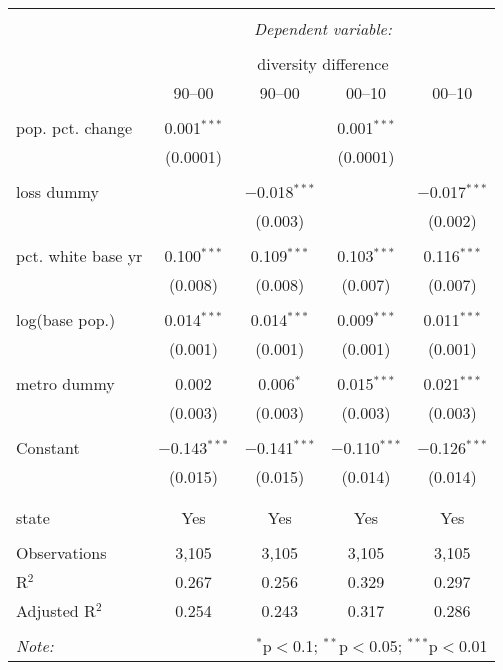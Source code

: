
\begin{table}[!htbp] \centering 
  \caption{} 
  \label{} 
\begin{tabular}{@{\extracolsep{5pt}}lcccc} 
\\[-1.8ex]\hline 
\hline \\[-1.8ex] 
 & \multicolumn{4}{c}{\textit{Dependent variable:}} \\ 
\cline{2-5} 
\\[-1.8ex] & \multicolumn{4}{c}{diversity difference} \\ 
 & 90--00 & 90--00 & 00--10 & 00--10 \\ 
\hline \\[-1.8ex] 
 pop. pct. change & 0.001$^{***}$ &  & 0.001$^{***}$ &  \\ 
  & (0.0001) &  & (0.0001) &  \\ 
  & & & & \\ 
 loss dummy &  & $-$0.018$^{***}$ &  & $-$0.017$^{***}$ \\ 
  &  & (0.003) &  & (0.002) \\ 
  & & & & \\ 
 pct. white base yr & 0.100$^{***}$ & 0.109$^{***}$ & 0.103$^{***}$ & 0.116$^{***}$ \\ 
  & (0.008) & (0.008) & (0.007) & (0.007) \\ 
  & & & & \\ 
 log(base pop.) & 0.014$^{***}$ & 0.014$^{***}$ & 0.009$^{***}$ & 0.011$^{***}$ \\ 
  & (0.001) & (0.001) & (0.001) & (0.001) \\ 
  & & & & \\ 
 metro dummy & 0.002 & 0.006$^{*}$ & 0.015$^{***}$ & 0.021$^{***}$ \\ 
  & (0.003) & (0.003) & (0.003) & (0.003) \\ 
  & & & & \\ 
 Constant & $-$0.143$^{***}$ & $-$0.141$^{***}$ & $-$0.110$^{***}$ & $-$0.126$^{***}$ \\ 
  & (0.015) & (0.015) & (0.014) & (0.014) \\ 
  & & & & \\ 
\hline \\[-1.8ex] 
state & Yes & Yes & Yes & Yes \\ 
\hline \\[-1.8ex] 
Observations & 3,105 & 3,105 & 3,105 & 3,105 \\ 
R$^{2}$ & 0.267 & 0.256 & 0.329 & 0.297 \\ 
Adjusted R$^{2}$ & 0.254 & 0.243 & 0.317 & 0.286 \\ 
\hline 
\hline \\[-1.8ex] 
\textit{Note:}  & \multicolumn{4}{r}{$^{*}$p$<$0.1; $^{**}$p$<$0.05; $^{***}$p$<$0.01} \\ 
\end{tabular} 
\end{table} 
